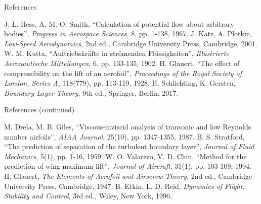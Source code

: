 \documentclass[aspectratio=169,11pt]{beamer}
\begin{document}
\begin{frame}{References}
\begin{reflist}
   
   \recordsref
   J. L. Hess, A. M. O. Smith, ``Calculation of potential flow about
        arbitrary bodies'', \emph{Progress in Aerospace Sciences}, 8,
        pp. 1-138, 1967.
   J. Katz, A. Plotkin, \emph{Low-Speed Aerodynamics}, 2nd ed.,
        Cambridge University Press, Cambridge, 2001.
   W. M. Kutta, ``Auftriebskr\"afte in str\"omenden Fl\"ussigkeiten'',
        \emph{Illustrierte Aeronautische Mitteilungen}, 6, pp. 133-135, 1902.
   H. Glauert, ``The effect of compressibility on the lift of an
        aerofoil'', \emph{Proceedings of the Royal Society of London, Series
        A}, 118(779), pp. 113-119, 1928.
   H. Schlichting, K. Gersten, \emph{Boundary-Layer Theory}, 9th ed.,
        Springer, Berlin, 2017.
\end{reflist}
\end{frame}

\begin{frame}{References (continued)}
\begin{reflist}
  \setcounter{enumi}{7}
   M. Drela, M. B. Giles, ``Viscous-inviscid analysis of transonic and
        low Reynolds number airfoils'', \emph{AIAA Journal}, 25(10),
        pp. 1347-1355, 1987.
   B. S. Stratford, ``The prediction of separation of the turbulent
        boundary layer'', \emph{Journal of Fluid Mechanics}, 5(1), pp. 1-16,
        1959.
   W. O. Valarezo, V. D. Chin, ``Method for the prediction of wing
        maximum lift'', \emph{Journal of Aircraft}, 31(1), pp. 103-109, 1994.
   H. Glauert, \emph{The Elements of Aerofoil and Airscrew Theory}, 2nd
        ed., Cambridge University Press, Cambridge, 1947.
   B. Etkin, L. D. Reid, \emph{Dynamics of Flight: Stability and
        Control}, 3rd ed., Wiley, New York, 1996.
\end{reflist}
\end{frame}
\end{document}
